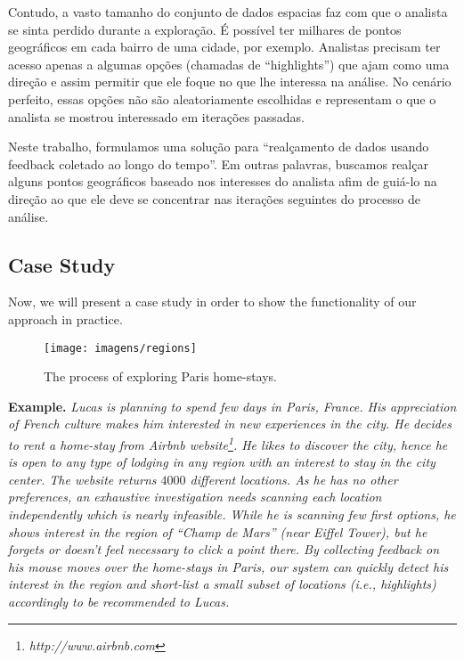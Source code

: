 Contudo, a vasto tamanho do conjunto de dados espacias faz com que o analista se sinta perdido durante a exploração. É possível ter milhares de pontos geográficos em cada bairro de uma cidade, por exemplo. Analistas precisam ter acesso apenas a algumas opções (chamadas de ``highlights'') que ajam como uma direção e assim permitir que ele foque no que lhe interessa na análise. No cenário perfeito, essas opções não são aleatoriamente escolhidas e representam o que o analista se mostrou interessado em iterações passadas.

Neste trabalho, formulamos uma solução para ``realçamento de dados usando feedback coletado ao longo do tempo''. Em outras palavras, buscamos realçar alguns pontos geográficos baseado nos interesses do analista afim de guiá-lo na direção ao que ele deve se concentrar nas iterações seguintes do processo de análise.

\subsection{Case Study}

Now, we will present a case study in order to show the functionality of our approach in practice.

\begin{figure}[t]
	\centering
	\texttt{[image: imagens/regions]}
	\caption{The process of exploring Paris home-stays.}
	\label{fig:regions}
\end{figure}

{\bf Example.} {\em Lucas is planning to spend few days in Paris, France. His appreciation of French culture makes him interested in new experiences in the city. He decides to rent a home-stay from Airbnb website\footnote{\it http://www.airbnb.com}. He likes to discover the city, hence he is open to any type of lodging in any region with an interest to stay in the city center. The website returns $4000$ different locations. As he has no other preferences, an exhaustive investigation needs scanning each location independently which is nearly infeasible. While he is scanning few first options, he shows interest in the region of ``Champ de Mars'' (near Eiffel Tower), but he forgets or doesn't feel necessary to click a point there. By collecting feedback on his mouse moves over the home-stays in Paris, our system can quickly detect his interest in the region and short-list a small subset of locations (i.e., highlights) accordingly to be recommended to Lucas.}

